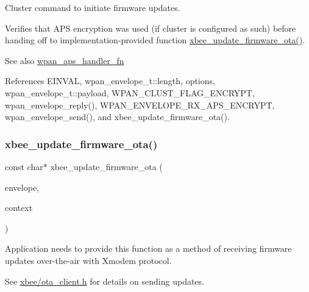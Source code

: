 Cluster command to initiate firmware updates. 

Verifies that A\+PS encryption was used (if cluster is configured as such) before handing off to implementation-\/provided function \hyperlink{group__xbee__ota__server_ga38fdff5e9fec8c3aa8bfd167621ee35c}{xbee\+\_\+update\+\_\+firmware\+\_\+ota()}.

\begin{DoxySeeAlso}{See also}
\hyperlink{group__wpan__aps_ga8575b0db762a5fbb858d4994c9b657e3}{wpan\+\_\+aps\+\_\+handler\+\_\+fn} 
\end{DoxySeeAlso}


References E\+I\+N\+V\+AL, wpan\+\_\+envelope\+\_\+t\+::length, options, wpan\+\_\+envelope\+\_\+t\+::payload, W\+P\+A\+N\+\_\+\+C\+L\+U\+S\+T\+\_\+\+F\+L\+A\+G\+\_\+\+E\+N\+C\+R\+Y\+PT, wpan\+\_\+envelope\+\_\+reply(), W\+P\+A\+N\+\_\+\+E\+N\+V\+E\+L\+O\+P\+E\+\_\+\+R\+X\+\_\+\+A\+P\+S\+\_\+\+E\+N\+C\+R\+Y\+PT, wpan\+\_\+envelope\+\_\+send(), and xbee\+\_\+update\+\_\+firmware\+\_\+ota().

\mbox{\label{group__xbee__ota__server_ga38fdff5e9fec8c3aa8bfd167621ee35c}} 
\subsubsection{\texorpdfstring{xbee\+\_\+update\+\_\+firmware\+\_\+ota()}{xbee\_update\_firmware\_ota()}}
{\footnotesize\ttfamily const char$\ast$ xbee\+\_\+update\+\_\+firmware\+\_\+ota (\begin{DoxyParamCaption}\item[{const \hyperlink{structwpan__envelope__t}{wpan\+\_\+envelope\+\_\+t} \hyperlink{group__hal_gaef060b3456fdcc093a7210a762d5f2ed}{F\+AR} $\ast$}]{envelope,  }\item[{void \hyperlink{group__hal_gaef060b3456fdcc093a7210a762d5f2ed}{F\+AR} $\ast$}]{context }\end{DoxyParamCaption})}



Application needs to provide this function as a method of receiving firmware updates over-\/the-\/air with Xmodem protocol. 

See \hyperlink{ota__client_8h}{xbee/ota\+\_\+client.\+h} for details on sending updates.

